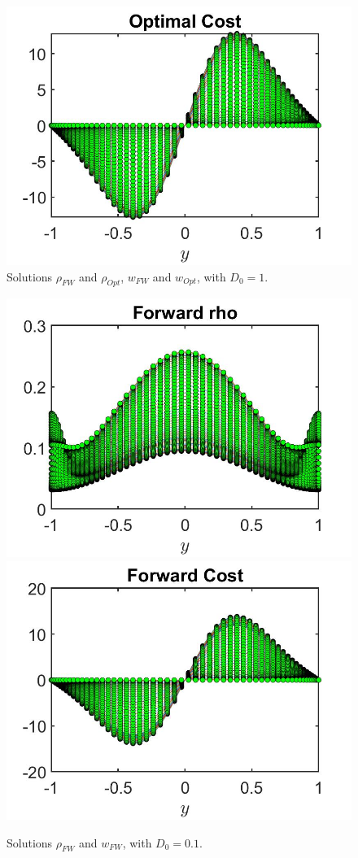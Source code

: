 \documentclass[11pt, a4paper]{article}
\theoremstyle{definition}
\begin{document}
\begin{figure}[h]
	\includegraphics[scale=0.3]{wFwOpt2.jpg}
	\caption{Solutions $\rho_{FW}$ and $\rho_{Opt}$, $w_{FW}$ and $w_{Opt}$,   with $D_0 = 1$.}
	\label{rhoD032}
\end{figure}

\begin{figure}[h]
	\includegraphics[scale=0.3]{wFrhoFW2a.jpg}	\includegraphics[scale=0.3]{wFwFW2a.jpg}
	\caption{Solutions $\rho_{FW}$ and $w_{FW}$,   with $D_0 = 0.1$.}
	\label{rhoD032a}
\end{figure}
\end{document}
